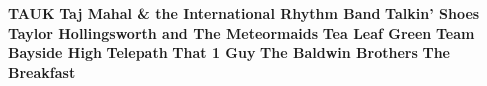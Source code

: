 \noindent \textbf{TAUK}\newline
\vspace{10pt} 
\newline
\vspace{10pt} 
\noindent \textbf{Taj Mahal \& the International Rhythm Band}\newline
\vspace{10pt} 
\newline
\vspace{10pt} 
\noindent \textbf{Talkin' Shoes}\newline
\vspace{10pt} 
\newline
\vspace{10pt} 
\noindent \textbf{Taylor Hollingsworth and The Meteormaids}\newline
\vspace{10pt} 
\newline
\vspace{10pt} 
\noindent \textbf{Tea Leaf Green}\newline
\vspace{10pt} 
\newline
\vspace{10pt} 
\noindent \textbf{Team Bayside High}\newline
\vspace{10pt} 
\newline
\vspace{10pt} 
\noindent \textbf{Telepath}\newline
\vspace{10pt} 
\newline
\vspace{10pt} 
\noindent \textbf{That 1 Guy}\newline
\vspace{10pt} 
\newline
\vspace{10pt} 
\noindent \textbf{The Baldwin Brothers}\newline
\vspace{10pt} 
\newline
\vspace{10pt} 
\noindent \textbf{The Breakfast}\newline
